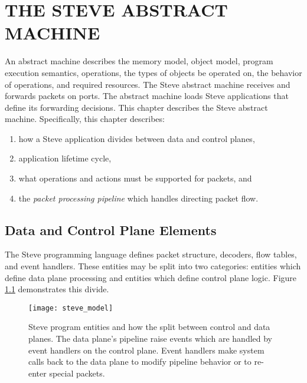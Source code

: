 \chapter{THE STEVE ABSTRACT MACHINE} \label{ch:pipeline_model}

An abstract machine describes the memory model, object model, program execution semantics, operations, the types of objects be operated on, the behavior of operations, and required resources. 
The Steve abstract machine receives and forwards packets on ports.
The abstract machine loads Steve applications that define its forwarding decisions.
This chapter describes the Steve abstract machine.
Specifically, this chapter describes:

\begin{enumerate}
\item how a Steve application divides between data and control planes,
\item application lifetime cycle,
\item what operations and actions must be supported for packets, and
\item the \emph{packet processing pipeline} which handles directing packet flow.
\end{enumerate}
%

\section{Data and Control Plane Elements}

The Steve programming language defines
packet structure, decoders, flow tables, and event handlers.
These entities may be split into two categories:
entities which define data plane processing and
entities which define control plane logic. 
Figure \ref{fg:abstract_switch} demonstrates this divide.

\begin{figure}[ht]
\texttt{[image: steve\_model]}
\caption{Steve program entities and how the split between control and
data planes. The data plane's pipeline raise events which are handled by event 
handlers on the control plane. Event handlers make system calls back to the
data plane to modify pipeline behavior or to re-enter special packets.}
\label{fg:abstract_switch} 
\end{figure}

